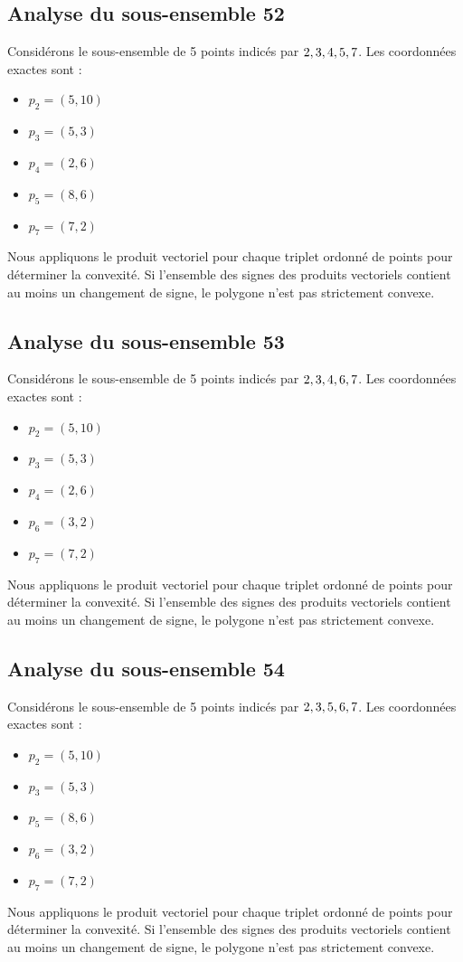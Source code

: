 \documentclass[11pt]{article}
\begin{document}
\subsection{Analyse du sous-ensemble 52}
Considérons le sous-ensemble de 5 points indicés par $\\{ 2, 3, 4, 5, 7 \\}$.
Les coordonnées exactes sont :
\begin{itemize}
\item $p_2 = (5, 10)$
\item $p_3 = (5, 3)$
\item $p_4 = (2, 6)$
\item $p_5 = (8, 6)$
\item $p_7 = (7, 2)$
\end{itemize}
Nous appliquons le produit vectoriel pour chaque triplet ordonné de points pour déterminer la convexité. Si l'ensemble des signes des produits vectoriels contient au moins un changement de signe, le polygone n'est pas strictement convexe.
\newpage

\subsection{Analyse du sous-ensemble 53}
Considérons le sous-ensemble de 5 points indicés par $\\{ 2, 3, 4, 6, 7 \\}$.
Les coordonnées exactes sont :
\begin{itemize}
\item $p_2 = (5, 10)$
\item $p_3 = (5, 3)$
\item $p_4 = (2, 6)$
\item $p_6 = (3, 2)$
\item $p_7 = (7, 2)$
\end{itemize}
Nous appliquons le produit vectoriel pour chaque triplet ordonné de points pour déterminer la convexité. Si l'ensemble des signes des produits vectoriels contient au moins un changement de signe, le polygone n'est pas strictement convexe.
\newpage

\subsection{Analyse du sous-ensemble 54}
Considérons le sous-ensemble de 5 points indicés par $\\{ 2, 3, 5, 6, 7 \\}$.
Les coordonnées exactes sont :
\begin{itemize}
\item $p_2 = (5, 10)$
\item $p_3 = (5, 3)$
\item $p_5 = (8, 6)$
\item $p_6 = (3, 2)$
\item $p_7 = (7, 2)$
\end{itemize}
Nous appliquons le produit vectoriel pour chaque triplet ordonné de points pour déterminer la convexité. Si l'ensemble des signes des produits vectoriels contient au moins un changement de signe, le polygone n'est pas strictement convexe.
\newpage
\end{document}
